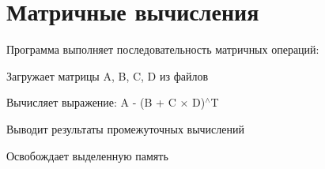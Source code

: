 \chapter{Матричные вычисления}
\hypertarget{index}{}\label{index}
Программа выполняет последовательность матричных операций\+:
\begin{DoxyEnumerate}
\item Загружает матрицы A, B, C, D из файлов
\item Вычисляет выражение\+: A -\/ (B + C × D)\texorpdfstring{$^\wedge$}{\string^}T
\item Выводит результаты промежуточных вычислений
\item Освобождает выделенную память 
\end{DoxyEnumerate}